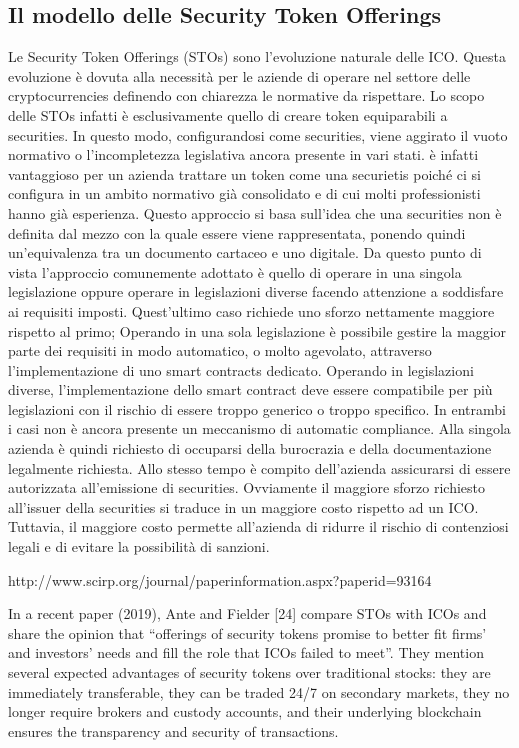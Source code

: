 \subsection{Il modello delle Security Token Offerings}
Le Security Token Offerings (STOs) sono l'evoluzione naturale delle ICO. Questa evoluzione è dovuta alla necessità per le aziende di operare nel settore delle cryptocurrencies definendo con chiarezza le normative da rispettare. Lo scopo delle STOs infatti è esclusivamente quello di creare token equiparabili a securities. In questo modo, configurandosi come securities, viene aggirato il vuoto normativo o l'incompletezza legislativa ancora presente in vari stati. è infatti vantaggioso per un azienda trattare un token come una securietis poiché ci si configura in un ambito normativo già consolidato e di cui molti professionisti hanno già esperienza. Questo approccio si basa sull'idea che una securities non è definita dal mezzo con la quale essere viene rappresentata, ponendo quindi un'equivalenza tra un documento cartaceo e uno digitale.  Da questo punto di vista l'approccio comunemente adottato è quello di operare in una singola legislazione oppure operare in legislazioni diverse facendo attenzione a soddisfare ai requisiti imposti. Quest'ultimo caso richiede uno sforzo nettamente maggiore rispetto al primo; Operando in una sola legislazione è possibile gestire la maggior parte dei requisiti in modo automatico, o molto agevolato, attraverso l'implementazione di uno smart contracts dedicato. Operando in legislazioni diverse, l'implementazione dello smart contract deve essere compatibile per più legislazioni con il rischio di essere troppo generico o troppo specifico. In entrambi i casi non è ancora presente un meccanismo di automatic compliance. Alla singola azienda è quindi richiesto di occuparsi della burocrazia e della documentazione legalmente richiesta. Allo stesso tempo è compito dell'azienda assicurarsi di essere autorizzata all'emissione di securities. Ovviamente il maggiore sforzo richiesto all'issuer della securities si traduce in un maggiore costo rispetto ad un ICO. Tuttavia, il maggiore costo permette all'azienda di ridurre il rischio di contenziosi legali e di evitare la possibilità di sanzioni. 

http://www.scirp.org/journal/paperinformation.aspx?paperid=93164

In a recent paper (2019), Ante and Fielder [24] compare STOs with ICOs and share the opinion that “offerings of security tokens promise to better fit firms’ and investors’ needs and fill the role that ICOs failed to meet”. They mention several expected advantages of security tokens over traditional stocks: they are immediately transferable, they can be traded 24/7 on secondary markets, they no longer require brokers and custody accounts, and their underlying blockchain ensures the transparency and security of transactions.



